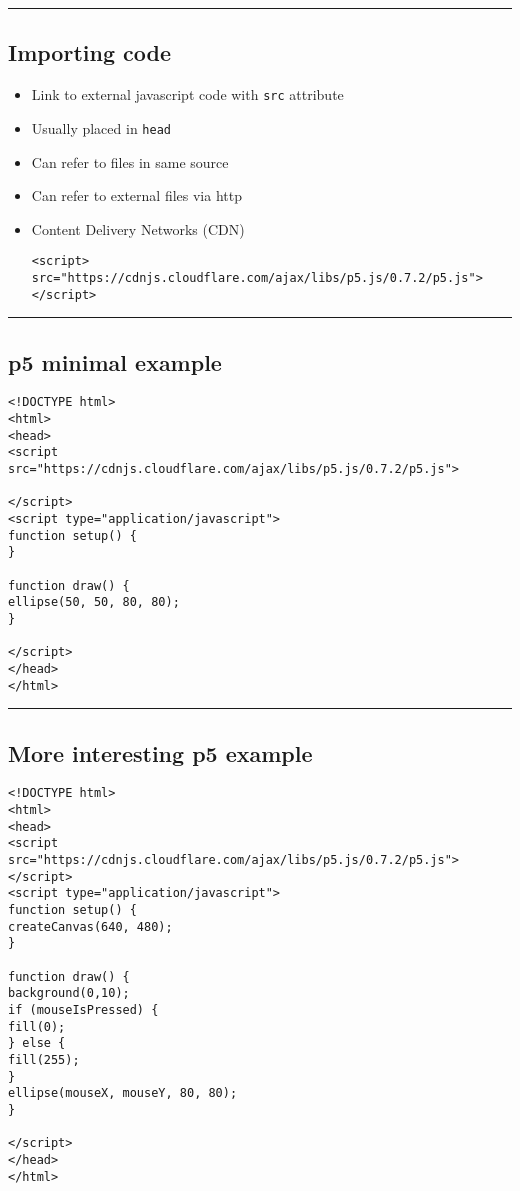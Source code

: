 \documentclass{article}[18pt]
\providecommand{\tightlist}{%
	\setlength{\itemsep}{0pt}\setlength{\parskip}{0pt}}
\begin{document}
\begin{center}\rule{0.5\linewidth}{\linethickness}\end{center}

\subsection{Importing code}

\begin{itemize}
	\tightlist
	\item
	Link to external javascript code with \texttt{src} attribute
	\item
	Usually placed in \texttt{head}
	\item
	Can refer to files in same source
	\item
	Can refer to external files via http
	\item
	Content Delivery Networks (CDN)\\
\begin{verbatim}
<script>
src="https://cdnjs.cloudflare.com/ajax/libs/p5.js/0.7.2/p5.js">
</script>
\end{verbatim}
	
	
\end{itemize}



\begin{center}\rule{0.5\linewidth}{\linethickness}\end{center}

\subsection{p5 minimal example}
\begin{verbatim}
<!DOCTYPE html>
<html>
<head>
<script src="https://cdnjs.cloudflare.com/ajax/libs/p5.js/0.7.2/p5.js">

</script>
<script type="application/javascript">
function setup() {
}

function draw() {
ellipse(50, 50, 80, 80);
}

</script>
</head>
</html>
\end{verbatim}
\newpage
\begin{center}\rule{0.5\linewidth}{\linethickness}\end{center}

\subsection{More interesting p5 example}
\begin{verbatim}
<!DOCTYPE html>
<html>
<head>
<script src="https://cdnjs.cloudflare.com/ajax/libs/p5.js/0.7.2/p5.js"></script>
<script type="application/javascript">
function setup() {
createCanvas(640, 480);
}

function draw() {
background(0,10);
if (mouseIsPressed) {
fill(0);
} else {
fill(255);
}
ellipse(mouseX, mouseY, 80, 80);
}

</script>
</head>
</html>
\end{verbatim}
\end{document}

